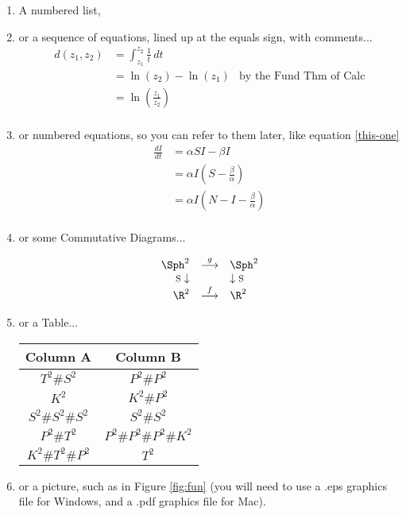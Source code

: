 \documentclass[12pt]{article}   %
\begin{document}
\begin{enumerate}
\item A numbered list,

\item or a sequence of equations, lined up at the equals sign, with comments...
\begin{align*}   %
d(z_1,z_2) & =  \int_{z_1}^{z_2} \frac{1}{t} \, dt \\
& =  \ln(z_2) - \ln(z_1) & \mbox{by the Fund Thm of Calc}\\
& =  \ln\left(\frac{z_1}{z_2}\right) \\ %
\end{align*}

\item or numbered equations, so you can refer to them later, like equation \ref{this-one}
\begin{align}
\frac{dI}{dt} &=  \alpha S I - \beta I \\
&=  \alpha I \left(S - \frac{\beta}{\alpha}\right) \label{this-one}\\
&=  \alpha I \left(N  - I  - \frac{\beta}{\alpha}\right)  \\
\end{align}

\item or some Commutative Diagrams...

$$\begin{array}{rcl}
\Sph^2  & \stackrel{g}{\longrightarrow} & \Sph^2 \\
\mbox{\footnotesize{S}} \downarrow & & \downarrow \mbox{\footnotesize{S}} \\
\R^2 & \stackrel{f}{\longrightarrow} & \R^2 \\
\end{array}$$

\item or a Table...

\begin{center}
\begin{tabular}{|c|c|}
\hline 
Column A & Column B \\ 
\hline
$T^2 \# S^2$ & $P^2 \# P^2$ \\
$K^2$ & $K^2 \# P^2$ \\
$S^2 \# S^2 \# S^2$ & $S^2 \# S^2$ \\
$P^2 \# T^2$ & $P^2 \# P^2 \# P^2 \# K^2$ \\
$K^2 \# T^2 \# P^2$ & $T^2$ \\
\hline
\end{tabular}
\end{center}

\item or a picture, such as in Figure \ref{fig:fun} (you will need to use a .eps graphics file for Windows, and a .pdf graphics
file for Mac).

\end{enumerate}
\end{document}

